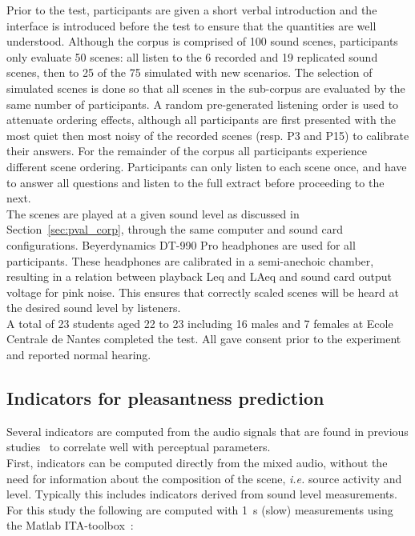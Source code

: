 \documentclass[11pt,a4paper]{article}
\begin{document}
Prior to the test, participants are given a short verbal introduction and the interface is introduced before the test to ensure that the quantities are well understood. Although the corpus is comprised of 100 sound scenes, participants only evaluate 50 scenes: all listen to the 6 recorded and 19 replicated sound scenes, then to 25 of the 75 simulated with new scenarios. The selection of simulated scenes is done so that all scenes in the sub-corpus are evaluated by the same number of participants. A random pre-generated listening order is used to attenuate ordering effects, although all participants are first presented with the most quiet then most noisy of the recorded scenes (resp. P3 and P15) to calibrate their answers. For the remainder of the corpus all participants experience different scene ordering. Participants can only listen to each scene once, and have to answer all questions and listen to the full extract before proceeding to the next.\\

The scenes are played at a given sound level as discussed in Section~\ref{sec:pval_corp}, through the same computer and sound card configurations. Beyerdynamics DT-990 Pro headphones are used for all participants. These headphones are calibrated in a semi-anechoic chamber, resulting in a relation between playback Leq and LAeq and sound card output voltage for pink noise. This ensures that correctly scaled scenes will be heard at the desired sound level by listeners.\\

A total of 23 students aged 22 to 23 including 16 males and 7 females at Ecole Centrale de Nantes completed the test. All gave consent prior to the experiment and reported normal hearing.

\subsection{Indicators for pleasantness prediction}
\label{sec:inds}

Several indicators are computed from the audio signals that are found in previous studies~\cite{aumond2017, gontier2018, ricciardi2014} to correlate well with perceptual parameters.\\

First, indicators can be computed directly from the mixed audio, without the need for information about the composition of the scene, \textit{i.e.} source activity and level. Typically this includes indicators derived from sound level measurements. For this study the following are computed with 1~s (slow) measurements using the Matlab ITA-toolbox~\cite{itatoolbox2017}:
\end{document}
